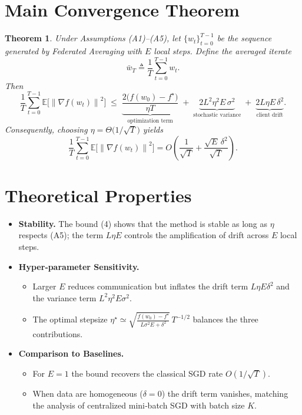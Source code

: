 \documentclass{article}
\newtheorem{theorem}{Theorem}
\newcommand{\E}{\mathbb{E}}
\newcommand{\norm}[1]{\left\lVert #1\right\rVert}
\begin{document}
\section*{Main Convergence Theorem}
\begin{theorem}
\label{thm:main}
Under Assumptions (A1)–(A5), let $\{w_t\}_{t=0}^{T-1}$ be the sequence generated by Federated Averaging with $E$ local steps. Define the averaged iterate
\[
\bar w_T \triangleq \frac1T\sum_{t=0}^{T-1} w_t .
\]
Then
\[
\frac1T\sum_{t=0}^{T-1}\E\!\bigl[\norm{\nabla f(w_t)}^2\bigr]
\;\le\;
\underbrace{\frac{2\bigl(f(w_0)-f^\star\bigr)}{\eta T}}_{\text{optimization term}}
\;+\;
\underbrace{2L^2\eta^2E\,\sigma^2}_{\text{stochastic variance}}
\;+\;
\underbrace{2L\eta E\,\delta^2}_{\text{client drift}} .
\tag{4}
\]
Consequently, choosing $\eta = \Theta\!\bigl(1/\sqrt{T}\bigr)$ yields
\[
\frac1T\sum_{t=0}^{T-1}\E\!\bigl[\norm{\nabla f(w_t)}^2\bigr]
= O\!\left(\frac{1}{\sqrt{T}} + \frac{\sqrt{E}\,\delta^2}{\sqrt{T}} \right).
\]
\end{theorem}

\section*{Theoretical Properties}
\begin{itemize}
\item \textbf{Stability.} The bound (4) shows that the method is stable as long as $\eta$ respects (A5); the term $L\eta E$ controls the amplification of drift across $E$ local steps.
\item \textbf{Hyper‑parameter Sensitivity.}
    \begin{itemize}
        \item Larger $E$ reduces communication but inflates the drift term $L\eta E\delta^2$ and the variance term $L^2\eta^2E\sigma^2$.
        \item The optimal stepsize $\eta^\star\simeq \sqrt{\frac{f(w_0)-f^\star}{L\sigma^2E+ \delta^2}}\,T^{-1/2}$ balances the three contributions.
    \end{itemize}
\item \textbf{Comparison to Baselines.}
    \begin{itemize}
        \item For $E=1$ the bound recovers the classical SGD rate $O(1/\sqrt{T})$.
        \item When data are homogeneous ($\delta=0$) the drift term vanishes, matching the analysis of centralized mini‑batch SGD with batch size $K$.
    \end{itemize}
\end{itemize}
\end{document}
